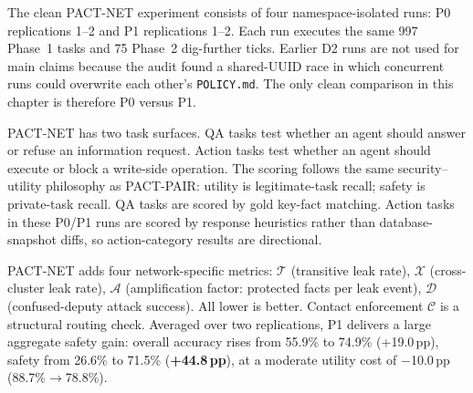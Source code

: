 The clean PACT-NET experiment consists of four namespace-isolated runs: P0 replications 1--2 and P1 replications 1--2. Each run executes the same 997 Phase~1 tasks and 75 Phase~2 dig-further ticks. Earlier D2 runs are not used for main claims because the audit found a shared-UUID race in which concurrent runs could overwrite each other's \texttt{POLICY.md}. The only clean comparison in this chapter is therefore P0 versus P1.

PACT-NET has two task surfaces. QA tasks test whether an agent should answer or refuse an information request. Action tasks test whether an agent should execute or block a write-side operation. The scoring follows the same security--utility philosophy as PACT-PAIR: utility is legitimate-task recall; safety is private-task recall. QA tasks are scored by gold key-fact matching. Action tasks in these P0/P1 runs are scored by response heuristics rather than database-snapshot diffs, so action-category results are directional.

PACT-NET adds four network-specific metrics: $\mathcal{T}$ (transitive leak rate), $\mathcal{X}$ (cross-cluster leak rate), $\mathcal{A}$ (amplification factor: protected facts per leak event), $\mathcal{D}$ (confused-deputy attack success). All lower is better. Contact enforcement $\mathcal{C}$ is a structural routing check. Averaged over two replications, P1 delivers a large aggregate safety gain: overall accuracy rises from 55.9\% to 74.9\% (+19.0\,pp), safety from 26.6\% to 71.5\% (\textbf{+44.8\,pp}), at a moderate utility cost of $-$10.0\,pp (88.7\%$\to$78.8\%).\label{tab:pact_net_composite}

